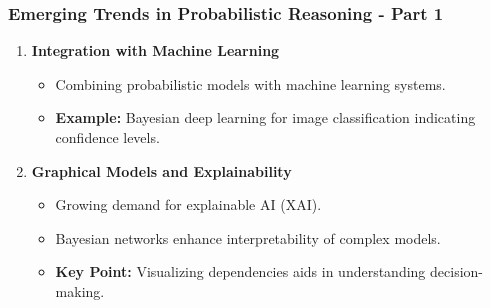 \documentclass[aspectratio=169]{beamer}
\begin{document}
\begin{frame}[fragile]
    \frametitle{Emerging Trends in Probabilistic Reasoning - Part 1}
    \begin{enumerate}
        \item \textbf{Integration with Machine Learning}
            \begin{itemize}
                \item Combining probabilistic models with machine learning systems.
                \item \textbf{Example:} Bayesian deep learning for image classification indicating confidence levels.
            \end{itemize}
        
        \item \textbf{Graphical Models and Explainability}
            \begin{itemize}
                \item Growing demand for explainable AI (XAI).
                \item Bayesian networks enhance interpretability of complex models.
                \item \textbf{Key Point:} Visualizing dependencies aids in understanding decision-making.
            \end{itemize}
    \end{enumerate}
\end{frame}
\end{document}

